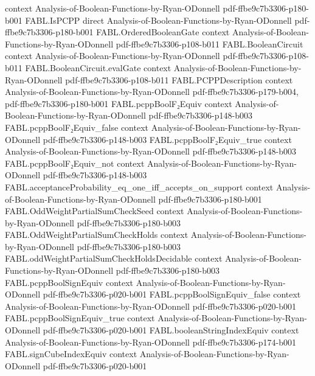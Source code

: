 \begin{theorem}
  {context}
  {Analysis-of-Boolean-Functions-by-Ryan-ODonnell}
  {pdf-ffbe9c7b3306-p180-b001}
\proofstep
  {FABL.IsPCPP}
  {direct}
  {Analysis-of-Boolean-Functions-by-Ryan-ODonnell}
  {pdf-ffbe9c7b3306-p180-b001}
\proofstep
  {FABL.OrderedBooleanGate}
  {context}
  {Analysis-of-Boolean-Functions-by-Ryan-ODonnell}
  {pdf-ffbe9c7b3306-p108-b011}
\proofstep
  {FABL.BooleanCircuit}
  {context}
  {Analysis-of-Boolean-Functions-by-Ryan-ODonnell}
  {pdf-ffbe9c7b3306-p108-b011}
\proofstep
  {FABL.BooleanCircuit.evalGate}
  {context}
  {Analysis-of-Boolean-Functions-by-Ryan-ODonnell}
  {pdf-ffbe9c7b3306-p108-b011}
\proofstep
  {FABL.PCPPDescription}
  {context}
  {Analysis-of-Boolean-Functions-by-Ryan-ODonnell}
  {pdf-ffbe9c7b3306-p179-b004,
    pdf-ffbe9c7b3306-p180-b001}
\proofstep
  {FABL.pcppBoolF₂Equiv}
  {context}
  {Analysis-of-Boolean-Functions-by-Ryan-ODonnell}
  {pdf-ffbe9c7b3306-p148-b003}
\proofstep
  {FABL.pcppBoolF₂Equiv_false}
  {context}
  {Analysis-of-Boolean-Functions-by-Ryan-ODonnell}
  {pdf-ffbe9c7b3306-p148-b003}
\proofstep
  {FABL.pcppBoolF₂Equiv_true}
  {context}
  {Analysis-of-Boolean-Functions-by-Ryan-ODonnell}
  {pdf-ffbe9c7b3306-p148-b003}
\proofstep
  {FABL.pcppBoolF₂Equiv_not}
  {context}
  {Analysis-of-Boolean-Functions-by-Ryan-ODonnell}
  {pdf-ffbe9c7b3306-p148-b003}
\proofstep
  {FABL.acceptanceProbability_eq_one_iff_accepts_on_support}
  {context}
  {Analysis-of-Boolean-Functions-by-Ryan-ODonnell}
  {pdf-ffbe9c7b3306-p180-b001}
\proofstep
  {FABL.OddWeightPartialSumCheckSeed}
  {context}
  {Analysis-of-Boolean-Functions-by-Ryan-ODonnell}
  {pdf-ffbe9c7b3306-p180-b003}
\proofstep
  {FABL.OddWeightPartialSumCheckHolds}
  {context}
  {Analysis-of-Boolean-Functions-by-Ryan-ODonnell}
  {pdf-ffbe9c7b3306-p180-b003}
\proofstep
  {FABL.oddWeightPartialSumCheckHoldsDecidable}
  {context}
  {Analysis-of-Boolean-Functions-by-Ryan-ODonnell}
  {pdf-ffbe9c7b3306-p180-b003}
\proofstep
  {FABL.pcppBoolSignEquiv}
  {context}
  {Analysis-of-Boolean-Functions-by-Ryan-ODonnell}
  {pdf-ffbe9c7b3306-p020-b001}
\proofstep
  {FABL.pcppBoolSignEquiv_false}
  {context}
  {Analysis-of-Boolean-Functions-by-Ryan-ODonnell}
  {pdf-ffbe9c7b3306-p020-b001}
\proofstep
  {FABL.pcppBoolSignEquiv_true}
  {context}
  {Analysis-of-Boolean-Functions-by-Ryan-ODonnell}
  {pdf-ffbe9c7b3306-p020-b001}
\proofstep
  {FABL.booleanStringIndexEquiv}
  {context}
  {Analysis-of-Boolean-Functions-by-Ryan-ODonnell}
  {pdf-ffbe9c7b3306-p174-b001}
\proofstep
  {FABL.signCubeIndexEquiv}
  {context}
  {Analysis-of-Boolean-Functions-by-Ryan-ODonnell}
  {pdf-ffbe9c7b3306-p020-b001}
\proofstep

\end{theorem}
